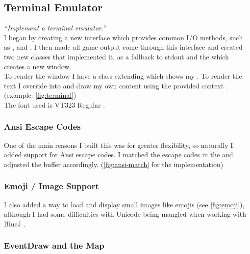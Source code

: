\documentclass{article}
\begin{document}
\begin{multicols}{2}
            \setlength{\parskip}{0.01cm plus4mm minus3mm}

                \subsection{Terminal Emulator}
                \textit{``Implement a terminal emulator.''} \\

                I began by creating a new  interface which provides common I/O methods, such as ,  and . I then made all game output come through this interface and created two new classes that implemented it,  as a fallback to stdout and the  which creates a new window. \\

                To render the window I have a class extending  which shows my . To render the text I override into  and draw my own content using the provided  context \cite{code-ref-7}. (example: \autoref{fig:terminal}) \\

                The font used is VT323 Regular \cite{font}.

                    \subsubsection{Ansi Escape Codes}

                        One of the main reasons I built this was for greater flexibility, so naturally I added support for Ansi escape codes. I matched the escape codes in the  and adjusted the buffer accordingly. (\autoref{fig:ansi-match} for the implementation)

                    \label{sec:emoji}
                    \subsubsection{Emoji / Image Support}

                        I also added a way to load and display small images like emojis (see \autoref{fig:emoji}), although I had some difficulties with Unicode being mangled when working with BlueJ \cite{bluej-issue}.

                    \subsubsection{EventDraw and the Map}


\end{multicols}
\end{document}
